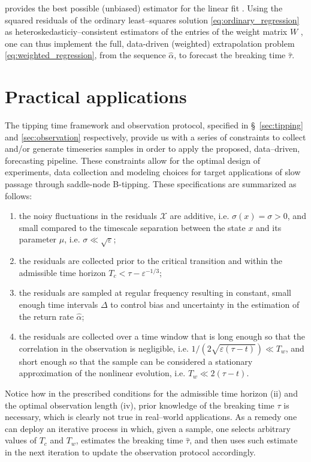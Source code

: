\documentclass[openacc]{rsproca_new}
\begin{document}
%
provides the best possible (unbiased) estimator for the linear fit \cite{Aitken1936}.
Using the squared residuals of the ordinary least--squares solution \eqref{eq:ordinary_regression} as heteroskedasticiy--consistent estimators of the entries of the weight matrix $W$ \cite[Thm.~$1$]{White1980}, one can thus implement the full, data-driven (weighted) extrapolation problem \eqref{eq:weighted_regression}, from the sequence $\hat\alpha$, to forecast the breaking time $\hat\tau$.

\section{Practical applications}\label{sec:application}
The tipping time framework and observation protocol, specified in \S~\ref{sec:tipping} and \ref{sec:observation} respectively, provide us with a series of constraints to collect and/or generate timeseries samples in order to apply the proposed, data--driven, forecasting pipeline.
These constraints allow for the optimal design of experiments, data collection and modeling choices for target applications of slow passage through saddle-node B-tipping. 
These specifications are summarized as follows:
%
\begin{enumerate}
  \item the noisy fluctuations in the residuals $\mathcal{X}$ are additive, i.e. $\sigma(x)=\sigma>0$, and small compared to the timescale separation between the state $x$ and its parameter $\mu$, i.e. $\sigma\ll\sqrt{\varepsilon}$;
  \item the residuals are collected prior to the critical transition and within the admissible time horizon $T_c < \tau - \varepsilon^{-1/3}$;
  \item the residuals are sampled at regular frequency resulting in constant, small enough time intervals $\Delta$ to control bias and uncertainty in the estimation of the return rate $\hat\alpha$;
  \item the residuals are collected over a time window that is long enough so that the correlation in the observation is negligible, i.e. $1/(2\sqrt{\varepsilon(\tau - t)})\ll T_w$, and short enough so that the sample can be considered a stationary approximation of the nonlinear evolution, i.e. $T_w\ll 2(\tau - t)$.
\end{enumerate}
%
Notice how in the prescribed conditions for the admissible time horizon (ii) and the optimal observation length (iv), prior knowledge of the breaking time $\tau$ is necessary, which is clearly not true in real--world applications.
As a remedy one can deploy an iterative process in which, given a sample, one selects arbitrary values of $T_c$ and $T_w$, estimates the breaking time $\hat\tau$, and then uses such estimate in the next iteration to update the observation protocol accordingly.
\end{document}
